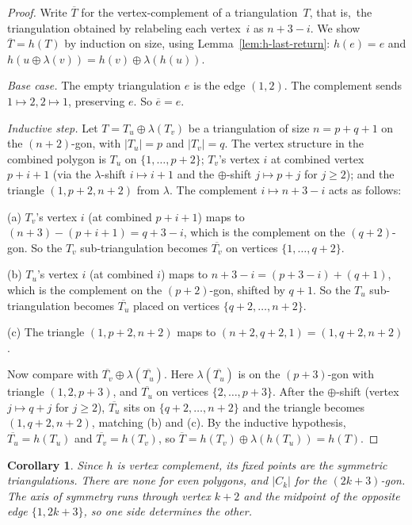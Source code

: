 \documentclass[a4paper,11pt]{article}
\newtheorem{corollary}[theorem]{Corollary}
\theoremstyle{definition}
\begin{document}
\begin{proof}
Write $\overline{T}$ for the vertex-complement of a
triangulation~$T$, that is,\ the triangulation obtained by
relabeling each vertex~$i$ as $n{+}3{-}i$.
We show $\overline{T} = h(T)$ by induction on size,
using Lemma~\ref{lem:h-last-return}:
$h(e) = e$ and
$h(u \oplus \lambda(v)) = h(v) \oplus \lambda(h(u))$.

\emph{Base case.} The empty triangulation $e$ is the edge
$(1,2)$. The complement sends $1 \mapsto 2, 2 \mapsto 1$,
preserving $e$. So $\overline{e} = e$.

\emph{Inductive step.} Let $T = T_u \oplus \lambda(T_v)$ be a triangulation of
size $n = p{+}q{+}1$ on the $(n{+}2)$-gon, with $|T_u| = p$ and $|T_v| = q$. The
vertex structure in the combined polygon is $T_u$ on
$\{1, \ldots, p{+}2\}$; $T_v$'s vertex $i$ at combined vertex $p{+}i{+}1$ (via
the $\lambda$-shift $i \mapsto i{+}1$ and the $\oplus$-shift $j \mapsto p{+}j$
for $j \geq 2$); and the triangle $(1, p{+}2, n{+}2)$ from $\lambda$.  The
complement $i \mapsto n{+}3{-}i$ acts as follows:

(a) $T_v$'s vertex $i$ (at combined $p{+}i{+}1$) maps
to $(n{+}3) - (p{+}i{+}1) = q{+}3{-}i$, which is the
complement on the $(q{+}2)$-gon. So the $T_v$
sub-triangulation becomes $\overline{T_v}$ on vertices
$\{1, \ldots, q{+}2\}$.

(b) $T_u$'s vertex $i$ (at combined $i$) maps to
$n{+}3{-}i = (p{+}3{-}i) + (q{+}1)$, which is the
complement on the $(p{+}2)$-gon, shifted by $q{+}1$.
So the $T_u$ sub-triangulation becomes $\overline{T_u}$
placed on vertices $\{q{+}2, \ldots, n{+}2\}$.

(c) The triangle $(1, p{+}2, n{+}2)$ maps to
$(n{+}2, q{+}2, 1) = (1, q{+}2, n{+}2)$.

Now compare with
$\overline{T_v} \oplus \lambda(\overline{T_u})$. Here
$\lambda(\overline{T_u})$ is on the $(p{+}3)$-gon with
triangle $(1, 2, p{+}3)$, and $\overline{T_u}$ on vertices
$\{2, \ldots, p{+}3\}$. After the $\oplus$-shift
(vertex $j \mapsto q{+}j$ for $j \geq 2$),
$\overline{T_u}$ sits on $\{q{+}2, \ldots, n{+}2\}$ and
the triangle becomes $(1, q{+}2, n{+}2)$, matching
(b) and (c). By the inductive hypothesis,
$\overline{T_u} = h(T_u)$ and $\overline{T_v} = h(T_v)$, so
$\overline{T} = h(T_v) \oplus \lambda(h(T_u)) = h(T)$.
\end{proof}

\begin{corollary}
Since $h$ is vertex complement, its fixed points are the
symmetric triangulations. There are none for even polygons,
and $|C_{k}|$ for the $(2k+3)$-gon. The axis of symmetry
runs through vertex $k+2$ and the midpoint of the opposite
edge $\{1, 2k+3\}$, so one side determines the other.
\end{corollary}
\end{document}
